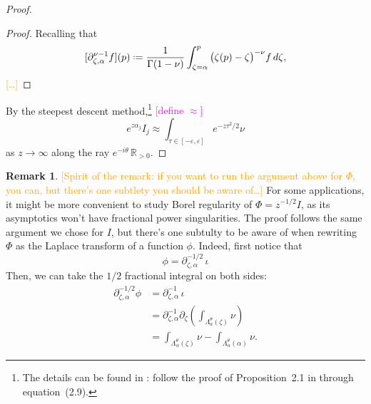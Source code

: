 \documentclass{article}
\let\Re\relax
\DeclareMathOperator{\Re}{Re}
\newcommand{\R}{\mathbb{R}}
\newcommand{\fracderiv}[3]{\partial^{#1}_{#2, #3}}
\newcommand*{\defeq}{\mathrel{\vcenter{\baselineskip0.5ex \lineskiplimit0pt
                     \hbox{\scriptsize.}\hbox{\scriptsize.}}}%
                     =}
\theoremstyle{definition}
\newtheorem{remark}[definition]{Remark}
\theoremstyle{plain}
\begin{document}
{\begin{proof}
\begin{proof}
Recalling that
\[ [\partial^{\nu-1}_{\zeta, \alpha} f](p) \defeq \frac{1}{\Gamma(1-\nu)} \int_{\zeta = \alpha}^p \big(\zeta(p)-\zeta\big)^{-\nu} f\,d\zeta, \]
\textcolor{orange}{[\ldots]}
\end{proof}

By the steepest descent method,\footnote{The details can be found in \cite{miller2006applied}: follow the proof of Proposition~2.1 in through equation~(2.9).} \textcolor{magenta}{[define $\approx$]}
\[ e^{z \alpha_j} I_j \approx \int_{\tau \in [-\varepsilon, \varepsilon]} e^{-z\tau^2/2} \nu \]
as $z \to \infty$ along the ray $e^{-i\theta}\, \R_{> 0}$.
\color{black}
\end{proof}
\begin{remark}\label{rmk:1/2-deriv}
    \textcolor{orange}{[Spirit of the remark: if you want to run the argument above for $\Phi$, you can, but there's one subtlety you should be aware of\ldots]} For some applications, it might be more convenient to study Borel regularity of $\Phi=z^{-1/2}I$, as its asymptotics won't have fractional power singularities. The proof follows the same argument we chose for $I$, but there's one subtulty to be aware of when rewriting $\Phi$ as the Laplace transform of a function $\phi$. Indeed, first notice that \[\phi = \fracderiv{-1/2}{\zeta}{\alpha} \, \iota \]
    Then, we can take the $1/2$ fractional integral on both sides:
    \begin{align*}
        \fracderiv{-1/2}{\zeta}{\alpha} \phi &= \fracderiv{-1}{\zeta}{\alpha} \, \iota \\
        & = \fracderiv{-1}{\zeta}{\alpha} \partial_\zeta \left( \int_{\Lambda_a^\theta(\zeta)}\nu \right) \\
        & = \int_{\Lambda_\alpha^\theta(\zeta)}\nu - \int_{\Lambda_\alpha^\theta(\alpha)}\nu.
    \end{align*}

\end{remark}}
\end{document}
